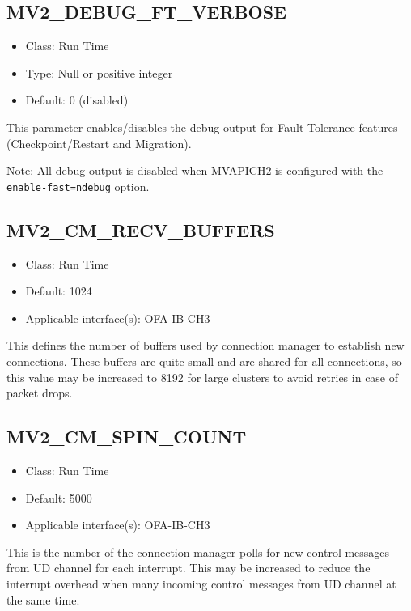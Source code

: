 \subsection{MV2\_DEBUG\_FT\_VERBOSE}
\label{def:mv2-debug-ft-verbose}
\begin{itemize}
    \item Class: Run Time
    \item Type: Null or positive integer
    \item Default: 0 (disabled)
\end{itemize}

This parameter enables/disables the debug output for Fault Tolerance features (Checkpoint/Restart and Migration).

Note: All debug output is disabled when MVAPICH2 is configured with the \texttt{--enable-fast=ndebug} option.


\subsection{MV2\_CM\_RECV\_BUFFERS}
\label{def:mv2-cm-recv-buffers}
\begin{itemize}
    \item Class: Run Time
    \item Default: 1024
    \item Applicable interface(s): OFA-IB-CH3
\end{itemize}
This defines the number of buffers used by connection manager to
establish new connections. These buffers are quite small and are
shared for all connections, so this value may be increased to 8192
for large clusters to avoid retries in case of packet drops.

\subsection{MV2\_CM\_SPIN\_COUNT}
\label{def:mv2-cm-spin-count}
\begin{itemize}
    \item Class: Run Time
    \item Default: 5000
    \item Applicable interface(s): OFA-IB-CH3
\end{itemize}
This is the number of the connection manager polls for new control
messages from UD channel for each interrupt. This may be increased
to reduce the interrupt overhead when many incoming control messages
from UD channel at the same time.


